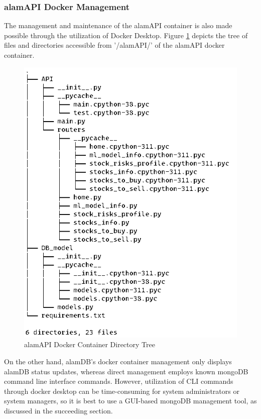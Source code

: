\subsubsection{alamAPI Docker Management}
\label{subsubsec:alamAPI_docker_management}
The management and maintenance of the alamAPI container is 
also made possible through the utilization of Docker Desktop.
Figure \ref{fig:alamapi_tree} depicts the tree of files and directories accessible 
from '/alamAPI/' of the alamAPI docker container.
\begin{figure}[ht]
    \centering
    \includegraphics[height=0.45\textheight]{./assets/Chapter_4/Documentation/alamapi_tree.png}
    \caption{alamAPI Docker Container Directory Tree}
    \label{fig:alamapi_tree}
\end{figure}
\FloatBarrier

On the other hand, alamDB's docker container management only displays 
alamDB status updates, whereas direct management employs known mongoDB 
command line interface commands. 
However, utilization of CLI commands through docker desktop can be 
time-consuming for system administrators or system managers, 
so it is best to use a GUI-based mongoDB management tool, 
as discussed in the succeeding section.

